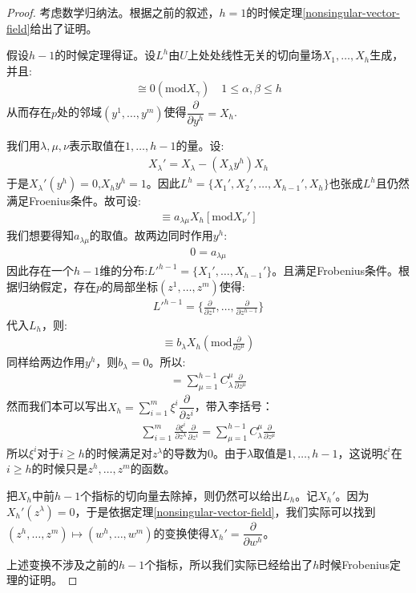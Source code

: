 \documentclass{package/fancy-book}
\begin{document}
\begin{proof}
    考虑数学归纳法。根据之前的叙述，$h=1$的时候定理\ref{nonsingular-vector-field}给出了证明。

    假设$h-1$的时候定理得证。设$L^h$由$U$上处处线性无关的切向量场$X_1,\dots,X_h$生成，并且:
    \begin{align}
        [X_\alpha,X_\beta]\cong 0(\mathrm{mod}X_\gamma) \quad 1\leq \alpha,\beta \leq h
    \end{align}
    从而存在$p$处的邻域$(y^1,\dots,y^m)$使得$\dfrac{\partial}{\partial y^h}=X_h$.

    我们用$\lambda,\mu,\nu$表示取值在$1,\dots,h-1$的量。设:
    \begin{align}
        X_\lambda'=X_\lambda-(X_\lambda y^h)X_h
    \end{align} 
    于是$X_\lambda'(y^h)=0$,$X_hy^h=1$。因此$L^h=\{X_1',X_2',\dots,X_{h-1}',X_h\}$也张成$L^h$且仍然满足Froenius条件。故可设:
    \begin{align}
        [X_\lambda',X_\mu']\equiv a_{\lambda\mu}X_h[\mathrm{mod} X_\nu']
    \end{align}
    我们想要得知$a_{\lambda\mu}$的取值。故两边同时作用$y^h$:
    \begin{align}
        0=a_{\lambda\mu}
    \end{align}
    因此存在一个$h-1$维的分布:$L'^{h-1}=\{X_1',\dots,X_{h-1}'\}$。且满足Frobenius条件。根据归纳假定，存在$p$的局部坐标$(z^1,\dots,z^m)$使得:
    \begin{align}
        L'^{h-1}=\{\frac{\partial}{\partial z^1},\dots,\frac{\partial}{\partial z^{h-1}}\}
    \end{align}
    代入$L_h$，则:
    \begin{align}
        [\frac{\partial}{\partial z^\lambda},X_h]\equiv  b_\lambda X_h(\mathrm{mod}\frac{\partial}{\partial z^\mu})
    \end{align}
    同样给两边作用$y^h$，则$b_\lambda=0$。所以:
    \begin{align}
        [\frac{\partial}{\partial z^\lambda},X_h]=\sum_{\mu=1}^{h-1}C_\lambda^\mu \frac{\partial}{\partial z^\mu}
    \end{align}
    然而我们本可以写出$X_h=\sum_{i=1}^m \xi^i \dfrac{\partial}{\partial z^i}$，带入李括号：
    \begin{align}
        \sum_{i=1}^m \frac{\partial \xi^i}{\partial z^\lambda}\frac{\partial}{\partial z^i}=\sum_{\mu=1}^{h-1}C_\lambda^\mu \frac{\partial}{\partial z^\mu}
    \end{align}
    所以$\xi^i$对于$i \geq h$的时候满足对$z^\lambda$的导数为$0$。由于$\lambda$取值是$1,\dots,h-1$，这说明$\xi^i$在$i \geq h$的时候只是$z^h,\dots,z^m$的函数。

    把$X_h$中前$h-1$个指标的切向量去除掉，则仍然可以给出$L_h$。记$X_h'$。因为$X_h'(z^\lambda)=0$，于是依据定理\ref{nonsingular-vector-field}，我们实际可以找到$(z^h,\dots,z^m)\mapsto (w^h,\dots,w^m)$的变换使得$X_h'=\dfrac{\partial}{\partial w^h}$。

    上述变换不涉及之前的$h-1$个指标，所以我们实际已经给出了$h$时候Frobenius定理的证明。
\end{proof}
\end{document}
